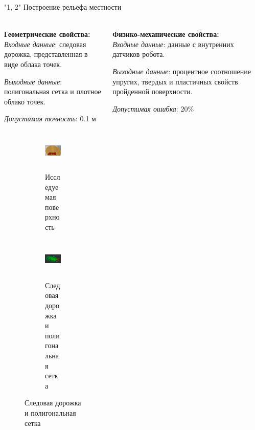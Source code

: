 \begin{frame}[t]{"1, 2" Построение рельефа местности}
    \framesubtitle{}
    \begin{columns}[T,onlytextwidth]
        \begin{column}{0.49\textwidth}
            \textbf{Геометрические свойства:}\\
            \textit{Входные данные}: следовая дорожка, представленная в виде облака точек.

            \textit{Выходные данные}: полигональная сетка и плотное облако точек.

            \textit{Допустимая точность}: 0.1 м
            \begin{figure}[H]
                \begin{subfigure}[t]{0.49\textwidth}
                    \centering\includegraphics[height=2cm,width=1\textwidth,keepaspectratio]{../images/slides/surface_research.png}
                    \caption*{Исследуемая поверхность}
                \end{subfigure}
                \begin{subfigure}[t]{0.49\textwidth}
                    \centering\includegraphics[height=2cm,width=1\textwidth,keepaspectratio]{../images/slides/result_research.png}
                    \caption*{Следовая дорожка и полигональная сетка}
                \end{subfigure}
            \end{figure}
        \end{column}
        \begin{column}{0.49\textwidth}
            \textbf{Физико-механические свойства:}\\
            \textit{Входные данные}: данные с внутренних датчиков робота.

            \textit{Выходные данные}: процентное соотношение упругих, твердых и пластичных свойств пройденной поверхности.

            \textit{Допустимая ошибка}: 20\% 


\end{column}
\end{columns}
\end{frame}
